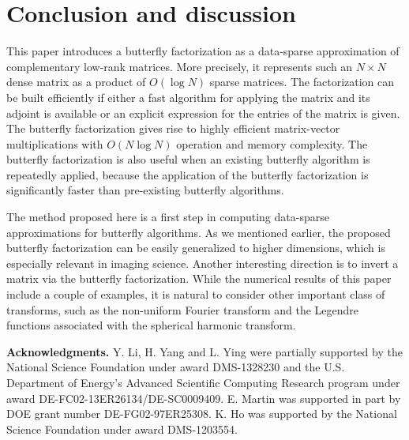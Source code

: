 \section{Conclusion and discussion}
\label{sec:conclusion}
This paper introduces a butterfly factorization as a data-sparse approximation of complementary low-rank matrices.  More precisely, it represents such an $N\times N$ dense matrix as a product of $O(\log
N)$ sparse matrices. The factorization can be built efficiently if either a fast algorithm for applying the matrix and its adjoint is available or an explicit expression for the entries of the matrix is given. The butterfly factorization gives rise to highly efficient matrix-vector multiplications with $O(N\log N)$ operation and memory complexity. The butterfly factorization is also useful when an existing butterfly algorithm is repeatedly applied, because the application of the butterfly factorization is significantly faster than pre-existing butterfly algorithms.

The method proposed here is a first step in computing data-sparse approximations for butterfly algorithms. As we mentioned earlier, the proposed butterfly factorization can be easily generalized to higher dimensions, which is especially relevant in imaging science. Another interesting direction is to invert a matrix via the butterfly factorization. While the numerical results of this paper include a couple of examples, it is natural to consider other important class of transforms, such as the non-uniform Fourier transform and the Legendre functions associated with the spherical harmonic transform.

{\bf Acknowledgments.}  Y. Li, H. Yang and L. Ying were partially supported by the National Science Foundation under award DMS-1328230 and the U.S. Department of Energy's Advanced Scientific Computing Research program under award DE-FC02-13ER26134/DE-SC0009409. E. Martin was supported in part by DOE grant number DE-FG02-97ER25308. K. Ho was supported by the National Science Foundation under award DMS-1203554.


